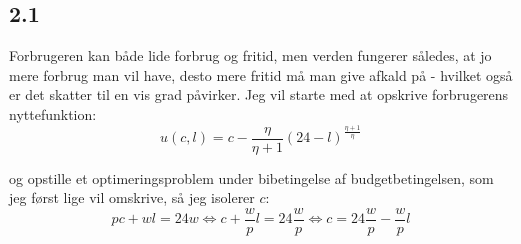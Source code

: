 \documentclass{article}
\begin{document}
\subsection*{2.1}
Forbrugeren kan både lide forbrug og fritid, men verden fungerer således, at jo mere forbrug man vil have, desto mere fritid må man give afkald på - hvilket også er det skatter til en vis grad påvirker. Jeg vil starte med at opskrive forbrugerens nyttefunktion:
\begin{equation}
    u(c, l)=c-\frac{\eta}{\eta+1}(24-l)^{\frac{\eta+1}{\eta}}
\end{equation}

og opstille et optimeringsproblem under bibetingelse af budgetbetingelsen, som jeg først lige vil omskrive, så jeg isolerer $c$:
\begin{equation}
    pc+wl=24w \Leftrightarrow c+ \frac{w}{p}l=24\frac{w}{p} \Leftrightarrow c=24\frac{w}{p}-\frac{w}{p}l
\end{equation}
\end{document}
